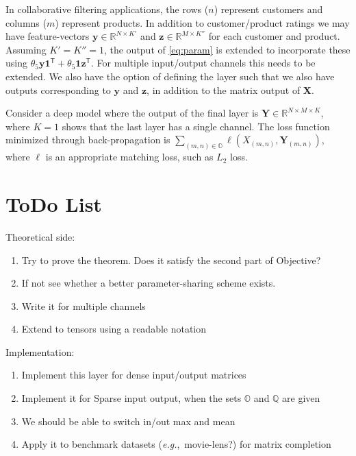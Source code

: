 \documentclass{article}
\newcommand{\eg}[0]{\emph{e.g.},~}
\newcommand{\mat}[1]{\ensuremath{\mathbf{#1}}}
\newcommand{\set}[1]{\ensuremath{\mathbb{#1}}}
\newcommand{\Trp}[0]{\ensuremath{^{\mathsf{T}}}}
\newcommand{\XX}[0]{\ensuremath{\mat{X}}}
\newcommand{\YY}[0]{\ensuremath{\mat{Y}}}
\newcommand{\yy}[0]{\ensuremath{\mat{y}}}
\newcommand{\zz}[0]{\ensuremath{\mat{z}}}
\renewcommand{\Re}[0]{\ensuremath{\set{R}}}
\theoremstyle{definition}
\begin{document}
In collaborative filtering applications, the rows ($n$) represent customers and columns ($m$)
represent products. In addition to customer/product ratings we may have feature-vectors $\yy \in \Re^{N \times K'}$ and
$\zz \in \Re^{M \times K''}$ for each customer and product. Assuming $K' = K'' = 1$, the output of \cref{eq:param} is extended to incorporate
these using $\theta_5 \yy \mat{1}\Trp + \theta_5 \mat{1} \zz\Trp$. For multiple input/output channels this needs to be extended.
We also have the option of defining the layer such that we also have outputs corresponding to $\yy$ and $\zz$, in addition to the matrix output of $\XX$.

Consider a deep model where the output of the final layer is $\YY \in \Re^{N \times M \times K}$,
where $K=1$ shows that the last layer has a single channel.
The loss function minimized through back-propagation is
$\sum_{(m,n) \in \set{O}} \ell(X_{(m,n)}, \YY_{(m,n)})$, where $\ell$ is an appropriate matching loss, such as $L_2$ loss.

\section{ToDo List}
Theoretical side:
\begin{enumerate}
\item Try to prove the theorem. Does it satisfy the second part of Objective? 
\item If not see whether a better parameter-sharing scheme exists.
\item Write it for multiple channels
\item Extend to tensors using a readable notation
\end{enumerate}

Implementation:
\begin{enumerate}
\item Implement this layer for dense input/output matrices
\item Implement it for Sparse input output, when the sets $\set{O}$ and $\set{Q}$ are given
\item We should be able to switch in/out max and mean
\item Apply it to benchmark datasets (\eg movie-lens?) for matrix completion
\end{enumerate}


{} %
\end{document}
